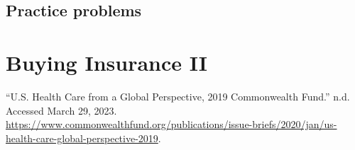 \documentclass[
  letterpaper,
  DIV=11,
  numbers=noendperiod]{scrreport}
\newlength{\cslhangindent}
\newlength{\cslentryspacingunit} %
\newenvironment{CSLReferences}[2] %
 {%
  \setlength{\parindent}{0pt}
  \ifodd #1
  \let\oldpar\par
  \def\par{\hangindent=\cslhangindent\oldpar}
  \fi
  \setlength{\parskip}{#2\cslentryspacingunit}
 }%
 {}
\theoremstyle{definition}
\theoremstyle{remark}
\begin{document}
\hypertarget{practice-problems}{%
\section{Practice problems}\label{practice-problems}}

\hypertarget{buying-insurance-ii}{%
\chapter*{Buying Insurance II}\label{buying-insurance-ii}}

\hypertarget{refs}{}
\begin{CSLReferences}{1}{0}
\leavevmode{}%
{``U.{S}. {Health} {Care} from a {Global} {Perspective}, 2019 {\textbar}
{Commonwealth} {Fund}.''} n.d. Accessed March 29, 2023.
\url{https://www.commonwealthfund.org/publications/issue-briefs/2020/jan/us-health-care-global-perspective-2019}.

\end{CSLReferences}
\end{document}
